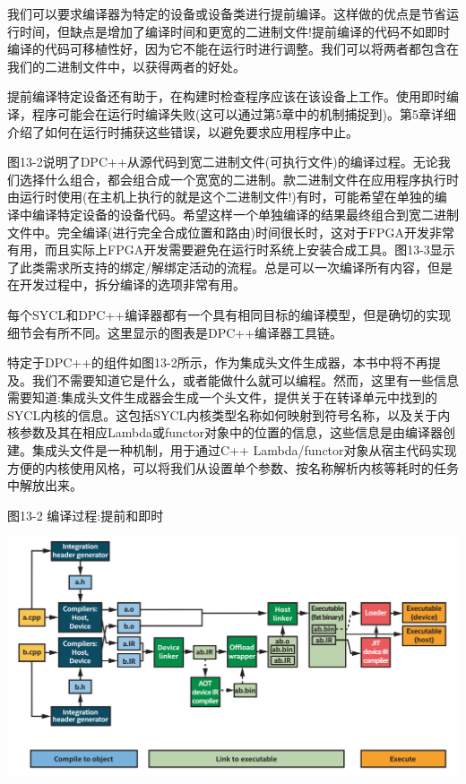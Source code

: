 我们可以要求编译器为特定的设备或设备类进行提前编译。这样做的优点是节省运行时间，但缺点是增加了编译时间和更宽的二进制文件!提前编译的代码不如即时编译的代码可移植性好，因为它不能在运行时进行调整。我们可以将两者都包含在我们的二进制文件中，以获得两者的好处。\par

提前编译特定设备还有助于，在构建时检查程序应该在该设备上工作。使用即时编译，程序可能会在运行时编译失败(这可以通过第5章中的机制捕捉到)。第5章详细介绍了如何在运行时捕获这些错误，以避免要求应用程序中止。\par

图13-2说明了DPC++从源代码到宽二进制文件(可执行文件)的编译过程。无论我们选择什么组合，都会组合成一个宽宽的二进制。款二进制文件在应用程序执行时由运行时使用(在主机上执行的就是这个二进制文件!)有时，可能希望在单独的编译中编译特定设备的设备代码。希望这样一个单独编译的结果最终组合到宽二进制文件中。完全编译(进行完全合成位置和路由)时间很长时，这对于FPGA开发非常有用，而且实际上FPGA开发需要避免在运行时系统上安装合成工具。图13-3显示了此类需求所支持的绑定/解绑定活动的流程。总是可以一次编译所有内容，但是在开发过程中，拆分编译的选项非常有用。\par

每个SYCL和DPC++编译器都有一个具有相同目标的编译模型，但是确切的实现细节会有所不同。这里显示的图表是DPC++编译器工具链。\par

特定于DPC++的组件如图13-2所示，作为集成头文件生成器，本书中将不再提及。我们不需要知道它是什么，或者能做什么就可以编程。然而，这里有一些信息需要知道:集成头文件生成器会生成一个头文件，提供关于在转译单元中找到的SYCL内核的信息。这包括SYCL内核类型名称如何映射到符号名称，以及关于内核参数及其在相应Lambda或functor对象中的位置的信息，这些信息是由编译器创建。集成头文件是一种机制，用于通过C++ Lambda/functor对象从宿主代码实现方便的内核使用风格，可以将我们从设置单个参数、按名称解析内核等耗时的任务中解放出来。\par

\hspace*{\fill} \par %
图13-2 编译过程:提前和即时
\begin{center}
	\includegraphics[width=1.\textwidth]{content/chapter-13/images/3}
\end{center}

